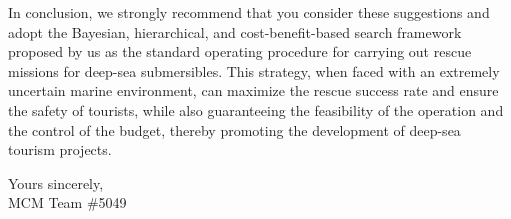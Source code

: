 \documentclass{mcmthesis}
\begin{document}
In conclusion, we strongly recommend that you consider these suggestions and adopt the Bayesian, hierarchical, and cost-benefit-based search framework proposed by us as the standard operating procedure for carrying out rescue missions for deep-sea submersibles.
This strategy, when faced with an extremely uncertain marine environment,
can maximize the rescue success rate and ensure the safety of tourists, while also guaranteeing the feasibility of the operation and the control of the budget, thereby promoting the development of deep-sea tourism projects.

\vspace{1.2em}
\begin{flushright}
Yours sincerely,\\
MCM Team \#5049
\end{flushright}
\end{document}
